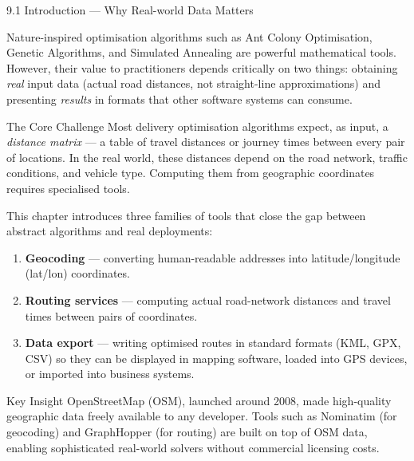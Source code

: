 \documentclass[aspectratio=169,10pt]{beamer}
\begin{document}
\begin{frame}[allowframebreaks]{9.1 Introduction --- Why Real-world Data Matters}

  Nature-inspired optimisation algorithms such as Ant Colony Optimisation,
  Genetic Algorithms, and Simulated Annealing are powerful mathematical tools.
  However, their value to practitioners depends critically on two things:
  obtaining \emph{real} input data (actual road distances, not straight-line
  approximations) and presenting \emph{results} in formats that other
  software systems can consume.

  \begin{block}{The Core Challenge}
    Most delivery optimisation algorithms expect, as input, a \emph{distance
    matrix} --- a table of travel distances or journey times between every
    pair of locations.  In the real world, these distances depend on the road
    network, traffic conditions, and vehicle type.  Computing them from
    geographic coordinates requires specialised tools.
  \end{block}

  \medskip
  This chapter introduces three families of tools that close the gap between
  abstract algorithms and real deployments:

  \begin{enumerate}
    \item \textbf{Geocoding} --- converting human-readable addresses into
          latitude/longitude (lat/lon) coordinates.
    \item \textbf{Routing services} --- computing actual road-network distances
          and travel times between pairs of coordinates.
    \item \textbf{Data export} --- writing optimised routes in standard formats
          (KML, GPX, CSV) so they can be displayed in mapping software, loaded
          into GPS devices, or imported into business systems.
  \end{enumerate}

  \begin{alertblock}{Key Insight}
    OpenStreetMap (OSM), launched around 2008, made high-quality geographic
    data freely available to any developer.  Tools such as Nominatim (for
    geocoding) and GraphHopper (for routing) are built on top of OSM data,
    enabling sophisticated real-world solvers without commercial licensing costs.
  \end{alertblock}

  \framebreak


\end{frame}
\end{document}
